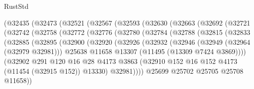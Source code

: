 \begin{lexlean}{RustStd}
\begin{coremodule}
        (@32435
          (@32473
            (@32521
              (@32567
                (@32593
                  (@32630
                    (@32663
                      (@32692
                        (@32721
                          (@32742
                            (@32758
                              (@32772
                                (@32776
                                  (@32780
                                    (@32784
                                      (@32788
                                        (@32815
                                          (@32833
                                            (@32885
                                              (@32895
                                                (@32900
                                                  (@32920
                                                    (@32926
                                                      (@32932
                                                        (@32946
                                                          (@32949 (@32964 (@32979 @32981)))
                                                          @25638
                                                          @11658
                                                          @13307
                                                          (@11495 (@13309 @7424 @3869))))
                                                      (@32902
                                                        @291
                                                        @120
                                                        @16
                                                        @28
                                                        @4173
                                                        @3863
                                                        (@32910
                                                          @152
                                                          @16
                                                          @152
                                                          @4173
                                                          (@11454 (@32915 @152))
                                                          @13330)
                                                        @32981))))
                                                @25699
                                                @25702
                                                @25705
                                                @25708
                                                @11658))

\end{coremodule}
\end{lexlean}

